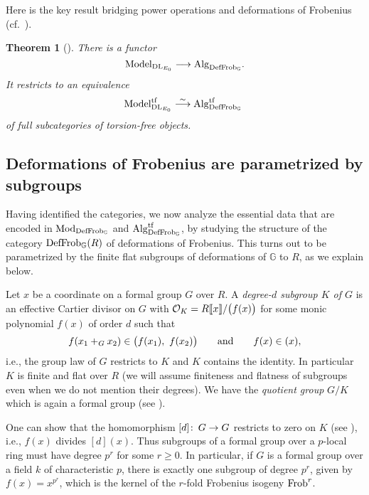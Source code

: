 \documentclass{gtpart}
\newtheorem{thm}{Theorem}
\theoremstyle{definition}
\theoremstyle{remark}
\def\co{\colon\thinspace}
\newcommand{\mb}[1]{\mathbb{#1}}
\newcommand{\CO}{{\cal O}}
\newcommand{\Mod}{{\rm Mod}}
\newcommand{\Alg}{{\rm Alg}}
\newcommand{\dl}{{\rm DL}}
\newcommand{\Frob}{{\rm Frob}}
\newcommand{\DF}{{{\rm DefFrob}_\BG}}
\newcommand{\Model}{{\rm Model}}
\newcommand{\BG}{{\mb G}}
\newcommand{\ad}{{\rm and}}
\newcommand{\tf}{{\rm tf}}
\numberwithin{equation}{section}
\numberwithin{thm}{section}
\begin{document}
Here is the key result bridging power operations and deformations of 
Frobenius (cf.~\cite[Theorem B]{cong}).  

\begin{thm}[{\cite[Pre-Theorem 16.5]{lpo}}]
\label{thm:bridge}
 There is a functor 
 \[
  \Model_{\dl_{E_0}} \longrightarrow \Alg_\DF.  
 \]
 It restricts to an equivalence 
 \[
  \Model_{\dl_{E_0}}^\tf \stackrel{\sim}{\longrightarrow} \Alg_\DF^\tf ~
 \]
 of full subcategories of torsion-free objects.  
\end{thm}


\subsection{Deformations of Frobenius are parametrized by subgroups}
\label{subsec:subgp}

Having identified the categories, we now analyze the essential data that 
are encoded in $\Mod_\DF$ and $\Alg_\DF^\tf$, by studying the structure 
of the category $\DF(R)$ of deformations of Frobenius.  This turns out 
to be parametrized by the finite flat subgroups of deformations of $\BG$ 
to $R$, as we explain below.  

Let $x$ be a coordinate on a formal group $G$ over $R$.  A 
{\em degree-$d$ subgroup $K$ of $G$} is an effective Cartier divisor on 
$G$ with $\CO_K = R \llbracket x \rrbracket / \big( f(x) \big)$ for some 
monic polynomial $f(x)$ of order $d$ such that 
\[
 f(x_1 +_G x_2) \in \big( f(x_1),~f(x_2) \big) \qquad \ad \qquad 
 f(x) \in (x), 
\]
i.e., the group law of $G$ restricts to $K$ and $K$ contains the 
identity.  In particular $K$ is finite and flat over $R$ (we will assume 
finiteness and flatness of subgroups even when we do not mention their 
degrees).  We have the {\em quotient group} $G/K$ which is again a 
formal group (see \cite[Section 5]{Str97}).  

One can show that the homomorphism $[d] \co G \to G$ restricts to zero 
on $K$ (see \cite[Section 1]{tateoort}), i.e., $f(x)$ divides $[d](x)$.  
Thus subgroups of a formal group over a $p$-local ring must have degree 
$p^r$ for some $r \geq 0$.  In particular, if $G$ is a formal group over 
a field $k$ of characteristic $p$, there is exactly one subgroup of 
degree $p^r$, given by $f(x) = x^{p^r}$, which is the kernel of the 
$r$-fold Frobenius isogeny $\Frob^r$.  
\end{document}
